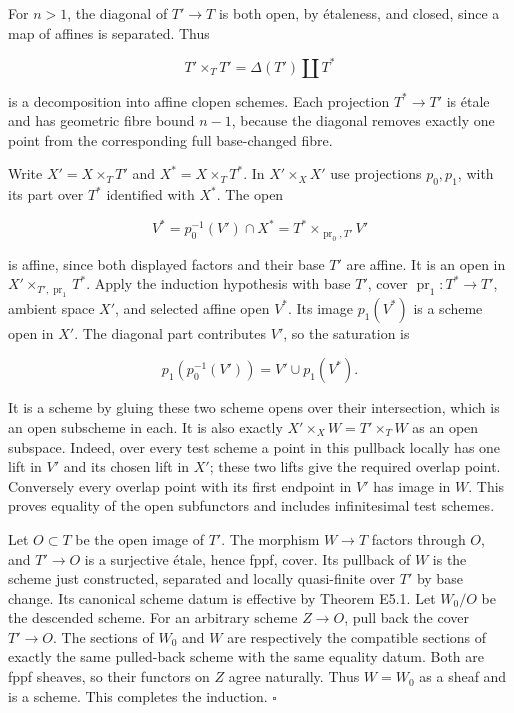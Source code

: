 \documentclass[11pt,a4paper,openany]{report}
\begin{document}
For \(n>1\), the diagonal of \(T'\to T\) is both open, by étaleness, and closed, since a map of affines is separated. Thus

\[
T'\times_T T'=\Delta(T')\amalg T^*
\]

is a decomposition into affine clopen schemes. Each projection \(T^*\to T'\) is étale and has geometric fibre bound \(n-1\), because the diagonal removes exactly one point from the corresponding full base-changed fibre.

Write \(X'=X\times_T T'\) and \(X^*=X\times_T T^*\). In \(X'\times_X X'\) use projections \(p_0,p_1\), with its part over \(T^*\) identified with \(X^*\). The open

\[
V^*=p_0^{-1}(V')\cap X^*
=T^*\times_{\operatorname{pr}_0,T'}V'
\]

is affine, since both displayed factors and their base \(T'\) are affine. It is an open in \(X'\times_{T',\operatorname{pr}_1}T^*\). Apply the induction hypothesis with base \(T'\), cover \(\operatorname{pr}_1:T^*\to T'\), ambient space \(X'\), and selected affine open \(V^*\). Its image \(p_1(V^*)\) is a scheme open in \(X'\). The diagonal part contributes \(V'\), so the saturation is

\[
p_1(p_0^{-1}(V'))=V'\cup p_1(V^*).
\]

It is a scheme by gluing these two scheme opens over their intersection, which is an open subscheme in each. It is also exactly \(X'\times_X W=T'\times_T W\) as an open subspace. Indeed, over every test scheme a point in this pullback locally has one lift in \(V'\) and its chosen lift in \(X'\); these two lifts give the required overlap point. Conversely every overlap point with its first endpoint in \(V'\) has image in \(W\). This proves equality of the open subfunctors and includes infinitesimal test schemes.

Let \(O\subset T\) be the open image of \(T'\). The morphism \(W\to T\) factors through \(O\), and \(T'\to O\) is a surjective étale, hence fppf, cover. Its pullback of \(W\) is the scheme just constructed, separated and locally quasi-finite over \(T'\) by base change. Its canonical scheme datum is effective by Theorem E5.1. Let \(W_0/O\) be the descended scheme. For an arbitrary scheme \(Z\to O\), pull back the cover \(T'\to O\). The sections of \(W_0\) and \(W\) are respectively the compatible sections of exactly the same pulled-back scheme with the same equality datum. Both are fppf sheaves, so their functors on \(Z\) agree naturally. Thus \(W=W_0\) as a sheaf and is a scheme. This completes the induction. \(\square\)
\end{document}
